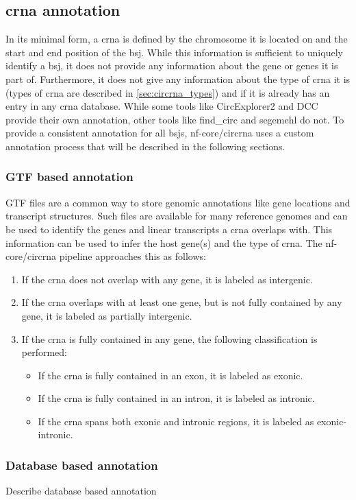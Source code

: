 \subsection{\gls{crna} annotation}
In its minimal form, a \gls{crna} is defined by the chromosome it is located on
and the start and end position of the \gls{bsj}.
While this information is sufficient to uniquely identify a \gls{bsj}, it does
not provide any information about the gene or genes it is part of.
Furthermore, it does not give any information about the type of \gls{crna} it
is (types of \gls{crna} are described in \cref{sec:circrna_types}) and if it is
already has an entry in any \gls{crna} database.
While some tools like CircExplorer2 and DCC provide their own annotation, other
tools like find\_circ and segemehl do not.
To provide a consistent annotation for all \glspl{bsj}, nf-core/circrna uses a
custom annotation process that will be described in the following sections.

\subsubsection{GTF based annotation}
GTF files are a common way to store genomic annotations like gene locations and
transcript structures.
Such files are available for many reference genomes and can be used to identify
the genes and linear transcripts a \gls{crna} overlaps with.
This information can be used to infer the host gene(s) and the type of
\gls{crna}.
The nf-core/circrna pipeline approaches this as follows: \begin{enumerate}
    \item If the \gls{crna} does not overlap with any gene, it is labeled as
          intergenic.
    \item If the \gls{crna} overlaps with at least one gene, but is not fully
          contained by any gene, it is labeled as partially intergenic.
    \item If the \gls{crna} is fully contained in any gene, the following
          classification is performed:
          \begin{itemize}
              \item If the \gls{crna} is fully contained in an exon, it is
                    labeled as
                    exonic.
              \item If the \gls{crna} is fully contained in an intron, it is
                    labeled
                    as intronic.
              \item If the \gls{crna} spans both exonic and intronic regions,
                    it is
                    labeled as exonic-intronic.
          \end{itemize}
\end{enumerate}

\subsubsection{Database based annotation} Describe database based annotation